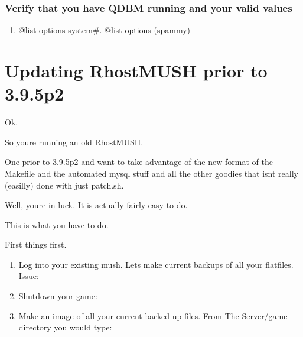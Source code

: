 \documentclass[letterpaper,10pt,english]{sphinxmanual}
\begin{document}
\subsubsection{Verify that you have QDBM running and your valid values}
\label{\detokenize{legacy:verify-that-you-have-qdbm-running-and-your-valid-values}}\begin{enumerate}
%
\item {} 
\sphinxAtStartPar
@list options system\#.  @list options (spammy)

\end{enumerate}


\section{Updating RhostMUSH prior to 3.9.5p2}
\label{\detokenize{legacy:updating-rhostmush-prior-to-3-9-5p2}}
\sphinxAtStartPar
Ok.

\sphinxAtStartPar
So you\textquotesingle{}re running an old RhostMUSH.

\sphinxAtStartPar
One prior to 3.9.5p2 and want to take advantage of the new
format of the Makefile and the automated mysql stuff and
all the other goodies that isn\textquotesingle{}t really (easilly) done
with just patch.sh.

\sphinxAtStartPar
Well, you\textquotesingle{}re in luck.  It is actually fairly easy to do.

\sphinxAtStartPar
This is what you have to do.

\sphinxAtStartPar
First thing\textquotesingle{}s first.
\begin{enumerate}
%
\item {} 
\sphinxAtStartPar
Log into your existing mush.  Let\textquotesingle{}s make current backups
of all your flatfiles.  Issue:

\begin{sphinxVerbatim}[commandchars=\\\{\}]
\end{sphinxVerbatim}

\item {} 
\sphinxAtStartPar
Shutdown your game:

\begin{sphinxVerbatim}[commandchars=\\\{\}]
\end{sphinxVerbatim}

\item {} 
\sphinxAtStartPar
Make an image of all your current backed up files.  From The Server/game directory you would type:

\begin{sphinxVerbatim}[commandchars=\\\{\}]
 
\end{sphinxVerbatim}

\end{enumerate}
\end{document}

